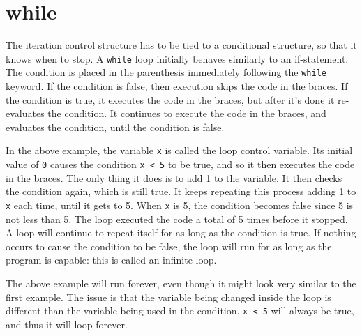 \section{while}

The iteration control structure has to be tied to a conditional structure, so that it knows when to stop. A \texttt{while} loop initially behaves similarly to an if-statement. The condition is placed in the parenthesis immediately following the \texttt{while} keyword. If the condition is false, then execution skips the code in the braces. If the condition is true, it executes the code in the braces, but after it's done it re-evaluates the condition. It continues to execute the code in the braces, and evaluates the condition, until the condition is false.\\



In the above example, the variable \texttt{x} is called the loop control variable. Its initial value of \texttt{0} causes the condition \texttt{x < 5} to be true, and so it then executes the code in the braces. The only thing it does is to add 1 to the variable. It then checks the condition again, which is still true. It keeps repeating this process adding 1 to \texttt{x} each time, until it gets to 5. When \texttt{x} is 5, the condition becomes false since 5 is not less than 5. The loop executed the code a total of 5 times before it stopped.\\


A loop will continue to repeat itself for as long as the condition is true. If nothing occurs to cause the condition to be false, the loop will run for as long as the program is capable: this is called an infinite loop.\\


The above example will run forever, even though it might look very similar to the first example. The issue is that the variable being changed inside the loop is different than the variable being used in the condition. \texttt{x < 5} will always be true, and thus it will loop forever.\\

